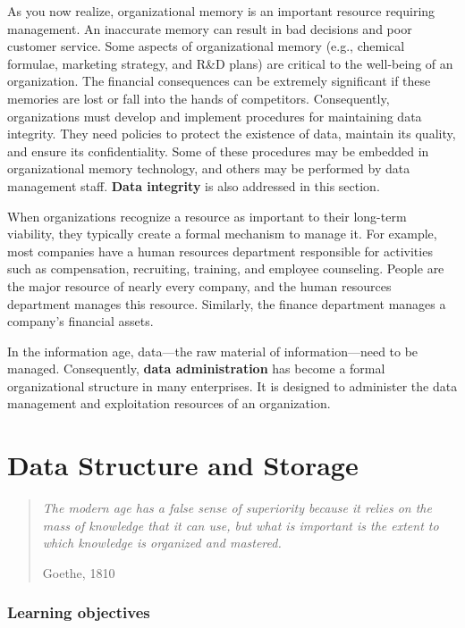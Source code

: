 \documentclass[
]{article}
\begin{document}
As you now realize, organizational memory is an important resource
requiring management. An inaccurate memory can result in bad decisions
and poor customer service. Some aspects of organizational memory (e.g.,
chemical formulae, marketing strategy, and R\&D plans) are critical to
the well-being of an organization. The financial consequences can be
extremely significant if these memories are lost or fall into the hands
of competitors. Consequently, organizations must develop and implement
procedures for maintaining data integrity. They need policies to protect
the existence of data, maintain its quality, and ensure its
confidentiality. Some of these procedures may be embedded in
organizational memory technology, and others may be performed by data
management staff. \textbf{Data integrity} is also addressed in this section.

When organizations recognize a resource as important to their long-term
viability, they typically create a formal mechanism to manage it. For
example, most companies have a human resources department responsible
for activities such as compensation, recruiting, training, and employee
counseling. People are the major resource of nearly every company, and
the human resources department manages this resource. Similarly, the
finance department manages a company's financial assets.

In the information age, data---the raw material of information---need to
be managed. Consequently, \textbf{data administration} has become a formal
organizational structure in many enterprises. It is designed to
administer the data management and exploitation resources of an
organization.

\hypertarget{data-structure-and-storage}{%
\section{Data Structure and Storage}\label{data-structure-and-storage}}

\begin{quote}
\emph{The modern age has a false sense of superiority because it relies on
the mass of knowledge that it can use, but what is important is the
extent to which knowledge is organized and mastered.}

Goethe, 1810
\end{quote}

\hypertarget{learning-objectives-11}{%
\subsubsection*{Learning objectives}\label{learning-objectives-11}}
\end{document}
